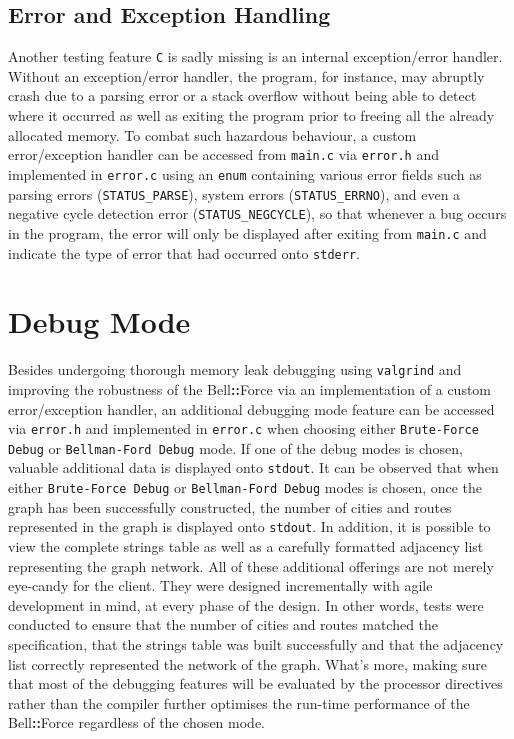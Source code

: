 \documentclass[11pt]{article}
\newcommand{\bellforce}{Bell\hspace*{1.61803398875pt}\textbf{::}\hspace*{1.61803398875pt}Force}
\begin{document}
\subsection{Error and Exception Handling} 
Another testing feature \texttt{C} is sadly missing is an internal exception/error handler. Without an exception/error handler, the program, for instance, may abruptly crash due to a parsing error or a stack overflow without being able to detect where it occurred as well as exiting the program prior to freeing all the already allocated memory. To combat such hazardous behaviour, a custom error/exception handler can be accessed from \texttt{main.c} via \texttt{error.h} and implemented in \texttt{error.c} using an \texttt{enum} containing various error fields such as parsing errors (\texttt{STATUS\_PARSE}), system errors 
(\texttt{STATUS\_ERRNO}), and even a negative cycle detection error (\texttt{STATUS\_NEGCYCLE}), so that whenever a bug occurs in the program, the error will only be displayed after exiting from \texttt{main.c} and indicate the type of error that had occurred onto \texttt{stderr}. 

\section{Debug Mode}
Besides undergoing thorough memory leak debugging using \texttt{valgrind} and improving the robustness of the \bellforce{} via an implementation of a custom error/exception handler, an additional debugging mode feature can be accessed via \texttt{error.h} and implemented in \texttt{error.c} when choosing either \texttt{Brute-Force Debug} or \texttt{Bellman-Ford Debug} mode. If one of the debug modes is chosen, valuable additional data is displayed onto \texttt{stdout}. It can be observed that when either \texttt{Brute-Force Debug} or \texttt{Bellman-Ford Debug} modes is chosen, once the graph has been successfully constructed, the number of cities and routes represented in the graph is displayed onto \texttt{stdout}. In addition, it is possible to view the complete strings table as well as a carefully formatted adjacency list representing the graph network. All of these additional offerings are not merely eye-candy for the client. They were designed incrementally with agile development in mind, at every phase of the design. In other words, tests were conducted to ensure that the number of cities and routes matched the specification, that the strings table was built successfully and that the adjacency list correctly represented the network of the graph. What's more, making sure that most of the debugging features will be evaluated by the processor directives rather than the compiler further optimises the run-time performance of the \bellforce{} regardless of the chosen mode.   
\end{document}
